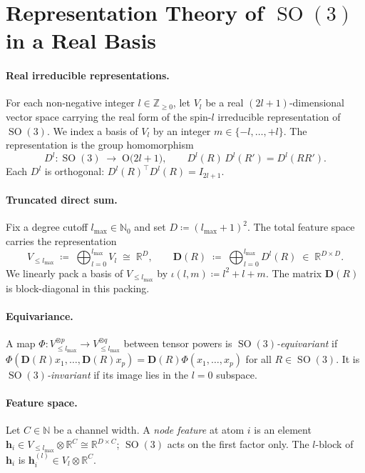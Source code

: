 \documentclass[11pt,a4paper]{article}
\DeclareMathOperator{\SO}{SO}
\newcommand{\R}{\mathbb{R}}
\newcommand{\N}{\mathbb{N}}
\newcommand{\Z}{\mathbb{Z}}
\newcommand{\bh}{\bm{h}}
\newcommand{\bD}{\bm{D}}
\newcommand{\lmax}{l_{\max}}
\theoremstyle{plain}
\theoremstyle{definition}
\theoremstyle{remark}
\begin{document}
\section{Representation Theory of $\SO(3)$ in a Real Basis}\label{sec:rep}

\paragraph{Real irreducible representations.}
For each non-negative integer $l\in\Z_{\geq 0}$, let $V_l$ be a real
$(2l+1)$-dimensional vector space carrying the real form of the spin-$l$
irreducible representation of $\SO(3)$. We index a basis of $V_l$ by an integer
$m\in\{-l,\dots,+l\}$. The representation is the group homomorphism
\begin{equation}
    D^l : \SO(3)\;\longrightarrow\;\mathrm{O}\bigl(2l+1\bigr),\qquad D^l(R)\,D^l(R')=D^l(RR').
\end{equation}
Each $D^l$ is orthogonal: $D^l(R)^\top D^l(R)=I_{2l+1}$.

\paragraph{Truncated direct sum.}
Fix a degree cutoff $\lmax\in\N_0$ and set $D\coloneqq(\lmax+1)^2$. The total
feature space carries the representation
\begin{equation}\label{eq:Drep}
    V_{\le\lmax} \;\coloneqq\; \bigoplus_{l=0}^{\lmax}V_l \;\cong\;\R^{D},\qquad
    \bD(R) \;\coloneqq\; \bigoplus_{l=0}^{\lmax}D^l(R)\;\in\;\R^{D\times D}.
\end{equation}
We linearly pack a basis of $V_{\le\lmax}$ by $\iota(l,m)\coloneqq l^2+l+m$.
The matrix $\bD(R)$ is block-diagonal in this packing.

\paragraph{Equivariance.}
A map $\Phi:V_{\le\lmax}^{\otimes p}\to V_{\le\lmax}^{\otimes q}$ between
tensor powers is \emph{$\SO(3)$-equivariant} if
$\Phi(\bD(R)x_1,\dots,\bD(R)x_p)=\bD(R)\Phi(x_1,\dots,x_p)$ for all
$R\in\SO(3)$. It is \emph{$\SO(3)$-invariant} if its image lies in the $l=0$
subspace.

\paragraph{Feature space.}
Let $C\in\N$ be a channel width. A \emph{node feature} at atom $i$ is an
element $\bh_i\in V_{\le\lmax}\otimes\R^C\cong\R^{D\times C}$; $\SO(3)$ acts on
the first factor only. The $l$-block of $\bh_i$ is $\bh_i^{(l)}\in
    V_l\otimes\R^C$.
\end{document}
